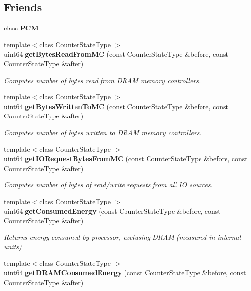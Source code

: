 \subsection*{Friends}
\begin{DoxyCompactItemize}
\item 
class {\bfseries P\+C\+M}\label{classUncoreCounterState_ab5f56d2e95ba3daf52c17b8a1d356d64}

\item 
{\footnotesize template$<$class Counter\+State\+Type $>$ }\\uint64 {\bf get\+Bytes\+Read\+From\+M\+C} (const Counter\+State\+Type \&before, const Counter\+State\+Type \&after)
\begin{DoxyCompactList}\small\item\em Computes number of bytes read from D\+R\+A\+M memory controllers. \end{DoxyCompactList}\item 
{\footnotesize template$<$class Counter\+State\+Type $>$ }\\uint64 {\bf get\+Bytes\+Written\+To\+M\+C} (const Counter\+State\+Type \&before, const Counter\+State\+Type \&after)
\begin{DoxyCompactList}\small\item\em Computes number of bytes written to D\+R\+A\+M memory controllers. \end{DoxyCompactList}\item 
{\footnotesize template$<$class Counter\+State\+Type $>$ }\\uint64 {\bf get\+I\+O\+Request\+Bytes\+From\+M\+C} (const Counter\+State\+Type \&before, const Counter\+State\+Type \&after)
\begin{DoxyCompactList}\small\item\em Computes number of bytes of read/write requests from all I\+O sources. \end{DoxyCompactList}\item 
{\footnotesize template$<$class Counter\+State\+Type $>$ }\\uint64 {\bf get\+Consumed\+Energy} (const Counter\+State\+Type \&before, const Counter\+State\+Type \&after)
\begin{DoxyCompactList}\small\item\em Returns energy consumed by processor, exclusing D\+R\+A\+M (measured in internal units) \end{DoxyCompactList}\item 
{\footnotesize template$<$class Counter\+State\+Type $>$ }\\uint64 {\bf get\+D\+R\+A\+M\+Consumed\+Energy} (const Counter\+State\+Type \&before, const Counter\+State\+Type \&after)

\end{DoxyCompactItemize}
